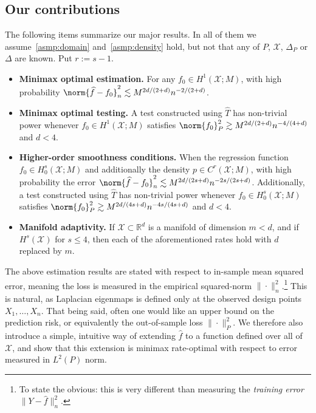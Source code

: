 \documentclass{article}
\newcommand{\Reals}{\mathbb{R}}
\newcommand{\1}{\mathbf{1}}
\newcommand{\Rd}{\Reals^d}
\newcommand{\Xset}{\mathcal{X}}
\newcommand{\mc}[1]{\mathcal{#1}}
\newcommand{\wh}[1]{\widehat{#1}}
\theoremstyle{alden}
\theoremstyle{aldenthm}
\theoremstyle{definition}
\theoremstyle{remark}
\begin{document}
\subsection{Our contributions}
The following items summarize our major results. In all of them we assume~\ref{asmp:domain} and~\ref{asmp:density} hold, but not that any of $P$, $\mc{X}$, $\Delta_P$ or $\Delta$ are known. Put $r := s - 1$.
\begin{itemize}
	\item \textbf{Minimax optimal estimation.} For any $f_0 \in H^1(\Xset;M)$, with high probability $\norm{\wh{f} - f_0}_{n}^2 \lesssim M^{2d/(2 + d)}n^{-2/(2 + d)}$.
	\item \textbf{Minimax optimal testing.}
	A test constructed using $\wh{T}$ has non-trivial power whenever $f_0 \in H^1(\Xset;M)$ satisfies $\norm{f_0}_{P}^2 \gtrsim M^{2d/(2 + d)}n^{-4/(4 + d)}$ and $d < 4$.
	\item \textbf{Higher-order smoothness conditions.} When the regression function $f_0 \in H_0^s(\Xset;M)$ and additionally the density $p \in C^{r}(\mc{X};M)$, with high probability the error $\norm{\wh{f} - f_0}_{n}^2 \lesssim M^{2d/(2s + d)}n^{-2s/(2s + d)}$. Additionally, a test constructed using $\wh{T}$ has non-trivial power whenever $f_0 \in H_0^s(\Xset;M)$ satisfies $\norm{f_0}_{P}^2 \gtrsim M^{2d/(4s + d)}n^{-4s/(4s + d)}$ and $d < 4$.
	\item \textbf{Manifold adaptivity.}
	If $\mc{X} \subset \Rd$ is a manifold of dimension $m < d$, and if $H^s(\mc{X})$ for $s \leq 4$, then each of the aforementioned rates hold with $d$ replaced by $m$.
\end{itemize}
The above estimation results are stated with respect to in-sample mean squared error, meaning the loss is measured in the empirical squared-norm $\|\cdot\|_n^2$.\footnote{To state the obvious: this is very different than measuring the \emph{training error} $\|Y - \wh{f}\|_n^2$.} This is natural, as Laplacian eigenmaps is defined only at the observed design points $X_1,\ldots,X_n$. That being said, often one would like an upper bound on the prediction risk, or equivalently the out-of-sample loss $\|\cdot\|_P^2$. We therefore also introduce a simple, intuitive way of extending $\wh{f}$ to a function defined over all of $\mc{X}$, and show that this extension is minimax rate-optimal with respect to error measured in $L^2(P)$ norm.
\end{document}
